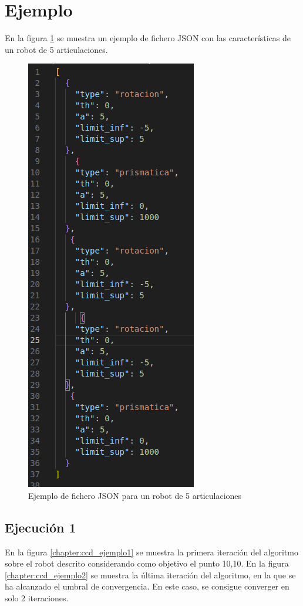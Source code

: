 \section{Ejemplo}
En la figura \ref{chapter:ccd_json2} se muestra un ejemplo de fichero JSON con las características de un robot de 5 articulaciones.
\begin{figure}[htb]
   \centering
   \includegraphics[width=.4\linewidth]{images/ccd_json2.png}
   \caption{Ejemplo de fichero JSON para un robot de 5 articulaciones}
   \label{chapter:ccd_json2}
\end{figure}

\subsection{Ejecución 1}
En la figura \ref{chapter:ccd_ejemplo1} se muestra la primera iteración del algoritmo sobre el robot descrito considerando como objetivo el punto 10,10.
En la figura \ref{chapter:ccd_ejemplo2} se muestra la última iteración del algoritmo, en la que se ha alcanzado el umbral de convergencia. En este caso, se consigue converger en solo 2 iteraciones.

